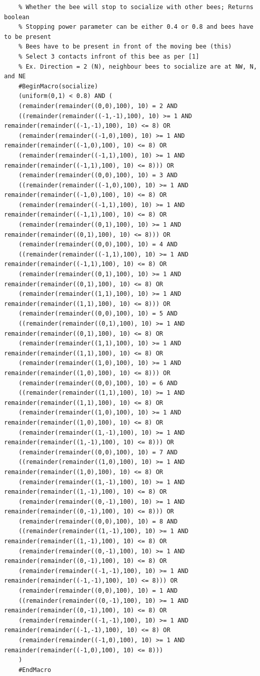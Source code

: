 \documentclass[conference,compsoc,onecolumn]{IEEEtran}
\begin{document}
\begin{lstlisting}
	% Whether the bee will stop to socialize with other bees; Returns boolean
	% Stopping power parameter can be either 0.4 or 0.8 and bees have to be present
	% Bees have to be present in front of the moving bee (this)
	% Select 3 contacts infront of this bee as per [1]
	% Ex. Direction = 2 (N), neighbour bees to socialize are at NW, N, and NE
	#BeginMacro(socialize)
	(uniform(0,1) < 0.8) AND (
	(remainder(remainder((0,0),100), 10) = 2 AND
	((remainder(remainder((-1,-1),100), 10) >= 1 AND remainder(remainder((-1,-1),100), 10) <= 8) OR
	(remainder(remainder((-1,0),100), 10) >= 1 AND remainder(remainder((-1,0),100), 10) <= 8) OR
	(remainder(remainder((-1,1),100), 10) >= 1 AND remainder(remainder((-1,1),100), 10) <= 8))) OR
	(remainder(remainder((0,0),100), 10) = 3 AND
	((remainder(remainder((-1,0),100), 10) >= 1 AND remainder(remainder((-1,0),100), 10) <= 8) OR
	(remainder(remainder((-1,1),100), 10) >= 1 AND remainder(remainder((-1,1),100), 10) <= 8) OR
	(remainder(remainder((0,1),100), 10) >= 1 AND remainder(remainder((0,1),100), 10) <= 8))) OR
	(remainder(remainder((0,0),100), 10) = 4 AND
	((remainder(remainder((-1,1),100), 10) >= 1 AND remainder(remainder((-1,1),100), 10) <= 8) OR
	(remainder(remainder((0,1),100), 10) >= 1 AND remainder(remainder((0,1),100), 10) <= 8) OR
	(remainder(remainder((1,1),100), 10) >= 1 AND remainder(remainder((1,1),100), 10) <= 8))) OR
	(remainder(remainder((0,0),100), 10) = 5 AND
	((remainder(remainder((0,1),100), 10) >= 1 AND remainder(remainder((0,1),100), 10) <= 8) OR
	(remainder(remainder((1,1),100), 10) >= 1 AND remainder(remainder((1,1),100), 10) <= 8) OR
	(remainder(remainder((1,0),100), 10) >= 1 AND remainder(remainder((1,0),100), 10) <= 8))) OR
	(remainder(remainder((0,0),100), 10) = 6 AND
	((remainder(remainder((1,1),100), 10) >= 1 AND remainder(remainder((1,1),100), 10) <= 8) OR
	(remainder(remainder((1,0),100), 10) >= 1 AND remainder(remainder((1,0),100), 10) <= 8) OR
	(remainder(remainder((1,-1),100), 10) >= 1 AND remainder(remainder((1,-1),100), 10) <= 8))) OR
	(remainder(remainder((0,0),100), 10) = 7 AND
	((remainder(remainder((1,0),100), 10) >= 1 AND remainder(remainder((1,0),100), 10) <= 8) OR
	(remainder(remainder((1,-1),100), 10) >= 1 AND remainder(remainder((1,-1),100), 10) <= 8) OR
	(remainder(remainder((0,-1),100), 10) >= 1 AND remainder(remainder((0,-1),100), 10) <= 8))) OR
	(remainder(remainder((0,0),100), 10) = 8 AND
	((remainder(remainder((1,-1),100), 10) >= 1 AND remainder(remainder((1,-1),100), 10) <= 8) OR
	(remainder(remainder((0,-1),100), 10) >= 1 AND remainder(remainder((0,-1),100), 10) <= 8) OR
	(remainder(remainder((-1,-1),100), 10) >= 1 AND remainder(remainder((-1,-1),100), 10) <= 8))) OR
	(remainder(remainder((0,0),100), 10) = 1 AND
	((remainder(remainder((0,-1),100), 10) >= 1 AND remainder(remainder((0,-1),100), 10) <= 8) OR
	(remainder(remainder((-1,-1),100), 10) >= 1 AND remainder(remainder((-1,-1),100), 10) <= 8) OR
	(remainder(remainder((-1,0),100), 10) >= 1 AND remainder(remainder((-1,0),100), 10) <= 8)))
	)
	#EndMacro
	

\end{lstlisting}
\end{document}
